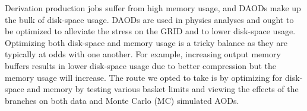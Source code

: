 

Derivation production jobs suffer from high memory usage, and DAODs make up the bulk of disk-space usage. 
DAODs are used in physics analyses and ought to be optimized to alleviate the stress on the GRID and to lower disk-space usage. 
Optimizing both disk-space and memory usage is a tricky balance as they are typically at odds with one another.
For example, increasing output memory buffers results in lower disk-space usage due to better compression but the memory usage will increase. 
The route we opted to take is by optimizing for disk-space and memory by testing various basket limits and viewing the effects of the branches on both data and Monte Carlo (MC) simulated AODs.  
